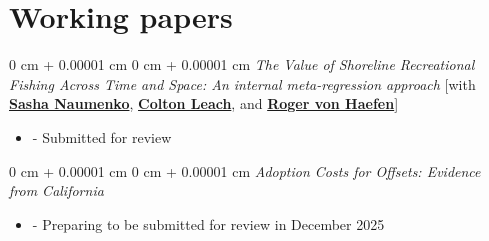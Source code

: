 \documentclass[11pt]{article}
\newenvironment{highlights}{
	\begin{itemize}[
		topsep=0.10 cm,
		parsep=0.10 cm,
		partopsep=0pt,
		itemsep=0pt,
		leftmargin=0 cm + 10pt
		]
	}{
	\end{itemize}
} %
\newenvironment{onecolentry}{
	\begin{adjustwidth}{
			0 cm + 0.00001 cm
		}{
			0 cm + 0.00001 cm
		}
	}{
	\end{adjustwidth}
} %
\begin{document}
\section{Working papers}





\begin{onecolentry}%
	\textit{The Value of Shoreline Recreational Fishing Across Time and Space: An internal meta-regression approach}
	[with \href{https://www.linkedin.com/in/avn-econ}{\textbf{Sasha Naumenko}}, \href{https://www.linkedin.com/in/colton-leach-54a080136}{\textbf{Colton Leach}}, and \href{https://cenrep.ncsu.edu/person/roger-von-haefen/}{\textbf{Roger von Haefen}}]
	\vspace{-1ex}
	\begin{highlights}
		\item[-] Submitted for review
	\end{highlights}
\end{onecolentry}

\begin{onecolentry}%
	\textit{Adoption Costs for Offsets: Evidence from California}
	\vspace{-1ex}
	\begin{highlights}
		\item[-] Preparing to be submitted for review in December 2025
	\end{highlights}
\end{onecolentry}
\end{document}
